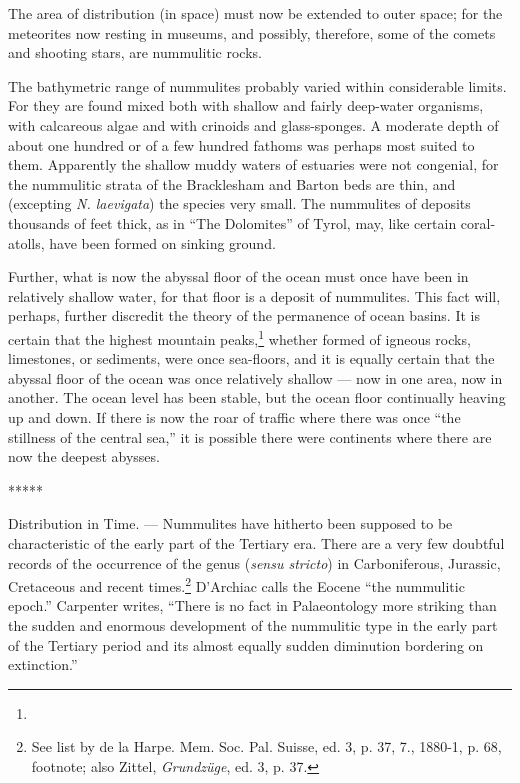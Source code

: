 \documentclass[a4paper, 12pt, oneside, landscape]{article}
\begin{document}
The area of distribution (in space) must now be extended to outer space; for the meteorites now resting in museums, and possibly, therefore, some of the comets and shooting stars, are nummulitic rocks.

The bathymetric range of nummulites probably varied within considerable limits. For they are found mixed both with shallow and fairly deep-water organisms, with calcareous algae and with crinoids and glass-sponges. A moderate depth of about one hundred or of a few hundred fathoms was perhaps most suited to them. Apparently the shallow muddy waters of estuaries were not congenial, for the nummulitic strata of the Bracklesham and Barton beds are thin, and (excepting \emph{N. laevigata}) the species very small. The nummulites of deposits thousands of feet thick, as in ``The Dolomites'' of Tyrol, may, like certain coral-atolls, have been formed on sinking ground.

Further, what is now the abyssal floor of the ocean must once have been in relatively shallow water, for that floor is a deposit of nummulites. This fact will, perhaps, further discredit the theory of the permanence of ocean basins. It is certain that the highest mountain peaks,\footnote{} whether formed of igneous rocks, limestones, or sediments, were once sea-floors, and it is equally certain that the abyssal floor of the ocean was once relatively shallow --- now in one area, now in another. The ocean level has been stable, but the ocean floor continually heaving up and down. If there is now the roar of traffic where there was once ``the stillness of the central sea,'' it is possible there were continents where there are now the deepest abysses.

\centerline{*\hspace{15mm}*\hspace{15mm}*\hspace{15mm}*\hspace{15mm}*}
\bigskip

Distribution in Time. --- Nummulites have hitherto been supposed to be characteristic of the early part of the Tertiary era. There are a very few doubtful records of the occurrence of the genus (\emph{sensu stricto}) in Carboniferous, Jurassic, Cretaceous and recent times.\footnote{See list by de la Harpe. Mem. Soc. Pal. Suisse, ed. 3, p. 37, 7., 1880-1, p. 68, footnote; also Zittel, \emph{Grundzüge}, ed. 3, p. 37.} D'Archiac calls the Eocene ``the nummulitic epoch.'' Carpenter writes, ``There is no fact in Palaeontology more striking than the sudden and enormous development of the nummulitic type in the early part of the Tertiary period and its almost equally sudden diminution bordering on extinction.''
\end{document}
